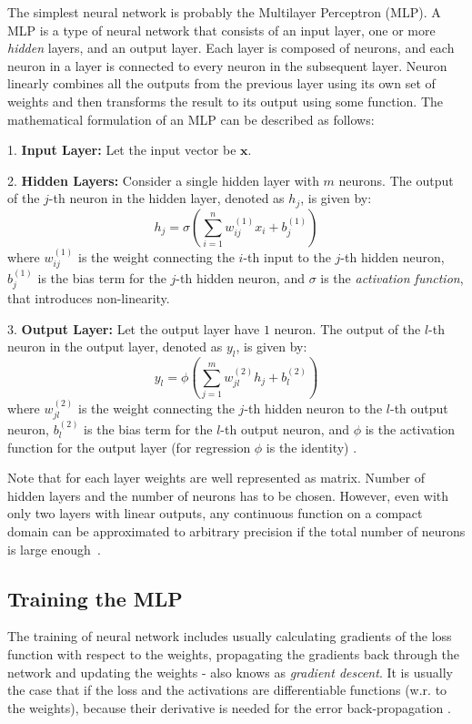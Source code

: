 The simplest neural network is probably the  Multilayer Perceptron (MLP). A MLP is a type of neural network that consists of an input layer, one or more \textit{hidden} layers, and an output layer. Each layer is composed of neurons, and each neuron in a layer is connected to every neuron in the subsequent layer. Neuron linearly combines all the outputs from the previous layer using its own set of weights and then transforms the result to its output using some function. The mathematical formulation of an MLP can be described as follows:

1. \textbf{Input Layer:} Let the input vector be $\bm{x}$.

2. \textbf{Hidden Layers:} Consider a single hidden layer with $m$ neurons. The output of the $j$-th neuron in the hidden layer, denoted as $h_j$, is given by:
\begin{equation}
	h_j = \sigma\left( \sum_{i=1}^{n} w_{ij}^{(1)} x_i + b_j^{(1)} \right)
\end{equation}
where $w_{ij}^{(1)}$ is the weight connecting the $i$-th input to the $j$-th hidden neuron, $b_j^{(1)}$ is the bias term for the $j$-th hidden neuron, and $\sigma$ is the \textit{activation function}, that introduces non-linearity.

3. \textbf{Output Layer:} Let the output layer have $1$ neuron. The output of the $l$-th neuron in the output layer, denoted as $y_l$, is given by:
\begin{equation}
	y_l = \phi\left( \sum_{j=1}^{m} w_{jl}^{(2)} h_j + b_l^{(2)} \right)
\end{equation}
where $w_{jl}^{(2)}$ is the weight connecting the $j$-th hidden neuron to the $l$-th output neuron, $b_l^{(2)}$ is the bias term for the $l$-th output neuron, and $\phi$ is the activation function for the output layer (for regression $\phi$ is the identity) \cite{bishop2006}.

Note that for each layer weights are well represented as matrix. Number of hidden layers and the number of neurons has to be chosen. However, even with only two layers with linear outputs, any continuous function on a compact domain can be approximated to arbitrary precision if the total number of neurons is large enough~\cite{bishop2006}.

\subsection*{Training the MLP}
The training of neural network includes usually calculating gradients of the loss function with respect to the weights, propagating the gradients back through the network and updating the weights - also knows as \textit{gradient descent}. It is usually the case that if the loss and the activations are differentiable functions (w.r. to the weights), because their derivative is needed for the error back-propagation \cite{bishop2006}.

